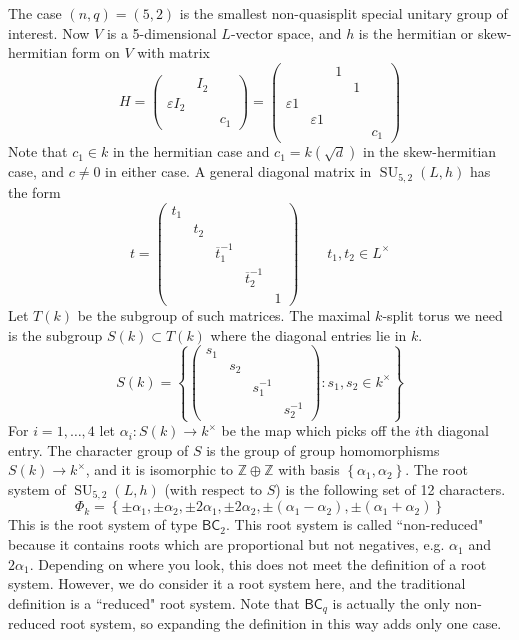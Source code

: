 \documentclass[12pt]{article}
\theoremstyle{definition}
\numberwithin{theorem}{subsection}
\newcommand{\Z}{\mathbb{Z}}
\newcommand{\eps}{\varepsilon}
\newcommand{\lb}{\left\{}
\newcommand{\rb}{\right\}}
\newcommand{\inv}{^{-1}}
\newcommand{\ov}{\overline}
\DeclareMathOperator{\SU}{SU}
\begin{document}
The case $(n,q) = (5,2)$ is the smallest non-quasisplit special unitary group of interest. Now $V$ is a 5-dimensional $L$-vector space, and $h$ is the hermitian or skew-hermitian form on $V$ with matrix
\[
	H =
	\begin{pmatrix}
		& I_2 \\
		\eps I_2 \\
		&& c_1
	\end{pmatrix}
	=
	\begin{pmatrix}
		&& 1 \\
		&&& 1 \\
		\eps 1 \\	
		& \eps 1 \\
		&&&& c_1
	\end{pmatrix}
\]
Note that $c_1 \in k$ in the hermitian case and $c_1 = k(\sqrt{d})$ in the skew-hermitian case, and $c \neq 0$ in either case. A general diagonal matrix in $\SU_{5,2}(L,h)$ has the form
\[
	t = 
	\begin{pmatrix}
		t_1 \\
		& t_2 \\
		&& \ov t_1 \inv \\
		&&& \ov t_2 \inv \\
		&&&& 1
	\end{pmatrix}
	\qquad t_1, t_2 \in L^\times
\]
Let $T(k)$ be the subgroup of such matrices. The maximal $k$-split torus we need is the subgroup $S(k) \subset T(k)$ where the diagonal entries lie in $k$.
\[
	S(k) = 
	\lb
	\begin{pmatrix}
		s_1 \\
		& s_2 \\
		&& s_1 \inv \\
		&&& s_2 \inv
	\end{pmatrix}
	: s_1, s_2 \in k^\times
	\rb
\]
For $i = 1, \ldots, 4$ let $\alpha_i:S(k) \to k^\times$ be the map which picks off the $i$th diagonal entry. The character group of $S$ is the group of group homomorphisms $S(k) \to k^\times$, and it is isomorphic to $\Z \oplus \Z$ with basis $\lb \alpha_1, \alpha_2 \rb$. The root system of $\SU_{5,2}(L,h)$ (with respect to $S$) is the following set of 12 characters.
\[
	\Phi_k = \lb \pm \alpha_1, \pm \alpha_2, \pm 2 \alpha_1, \pm 2\alpha_2, \pm (\alpha_1 - \alpha_2), \pm (\alpha_1 + \alpha_2) \rb
\]
This is the root system of type $\mathsf{BC}_2$. This root system is called ``non-reduced" because it contains roots which are proportional but not negatives, e.g. $\alpha_1$ and $2\alpha_1$. Depending on where you look, this does not meet the definition of a root system. However, we do consider it a root system here, and the traditional definition is a ``reduced" root system. Note that $\mathsf{BC}_q$ is actually the only non-reduced root system, so expanding the definition in this way adds only one case.
\end{document}

